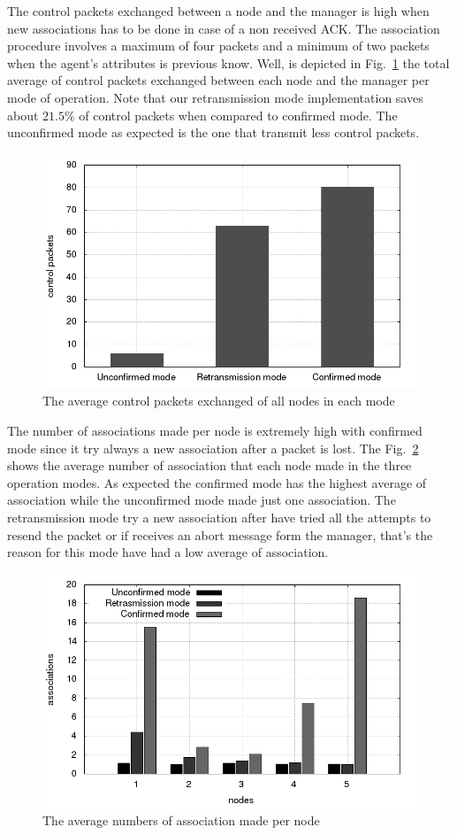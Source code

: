 The control packets exchanged between a node and the manager is high when new associations has to be done in case of a non received ACK. The association procedure involves a maximum of four packets and a minimum of two packets when the agent's attributes is previous know. Well, is depicted in Fig.~\ref{fig:controlpacketsexchanged} the total average of control packets exchanged between each node and the manager per mode of operation. Note that our retransmission mode implementation saves about $21.5\%$ of control packets when compared to confirmed mode. The unconfirmed mode as expected is the one that transmit less control packets.

\begin{figure}[htbp]
\centerline{\includegraphics[scale=0.4]{figures/averagecontrolpacketsexchanged.png}}
\caption{The average control packets exchanged of all nodes in each mode}
\label{fig:controlpacketsexchanged}
\end{figure}

The number of associations made per node is extremely high with confirmed mode since it try always a new association after a packet is lost. The Fig.~\ref{fig:associationnumber} shows the average number of association that each node made in the three operation modes. As expected the confirmed mode has the highest average of association while the unconfirmed mode made just one association. The retransmission mode try a new association after have tried all the attempts to resend the packet or if receives an abort message form the manager, that's the reason for this mode have had a low average of association.   

\begin{figure}[htbp]
\centerline{\includegraphics[scale=0.4]{figures/averagetotalassociationsmade.png}}
\caption{The average numbers of association made per node}
\label{fig:associationnumber}
\end{figure}